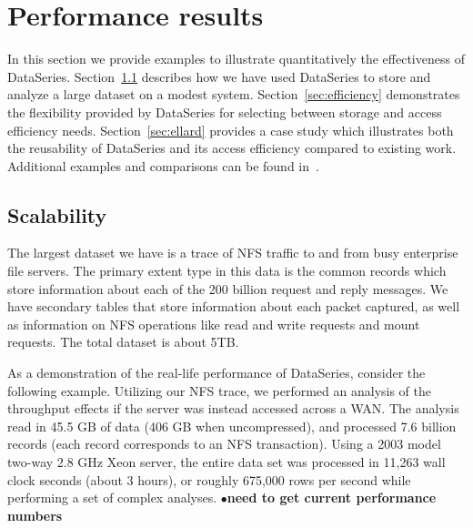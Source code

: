 \documentclass{acm_proc_article-sp}
\newcommand{\fix}[1]{{\LARGE\ensuremath{\bullet}}\textbf{#1}}
\begin{document}
\section{Performance results}\label{sec:results}


In this section we provide examples to illustrate quantitatively the 
effectiveness of DataSeries.  
Section~\ref{sec:scale} describes how we have used DataSeries to store 
and analyze a large dataset on a modest system.
Section~\ref{sec:efficiency} demonstrates the flexibility provided
by DataSeries for selecting between storage and access efficiency needs.
Section~\ref{sec:ellard} provides a case study which illustrates
both the reusability of DataSeries and its access efficiency compared
to existing work.
Additional examples and comparisons can be found 
in~\cite{DSTechnicalReportSnapshot}.

\subsection{Scalability}\label{sec:scale}

The largest dataset we have is a trace of NFS traffic to and from
busy enterprise file servers.
The primary extent type 
in this data is the common records which store information about each
of the 200 billion request and reply messages. We have secondary tables that
store information about each packet captured, as well as 
information on NFS operations 
like read and write requests and mount requests.  
The total dataset
is about 5TB.

As a demonstration of the real-life performance of
DataSeries, consider the following example.  Utilizing our NFS
trace, we performed an analysis of the throughput
effects if the server was instead accessed across a WAN.
The analysis read in 45.5 GB of data (406 GB when uncompressed), and
processed 7.6 billion records (each record corresponds to an NFS
transaction).  Using a 2003 model two-way 2.8 GHz Xeon server, the
entire data set was processed in 11,263 wall clock seconds (about 3
hours), or roughly 675,000 rows per second while performing a set of complex
analyses. \fix{need to get current performance numbers}
\end{document}
